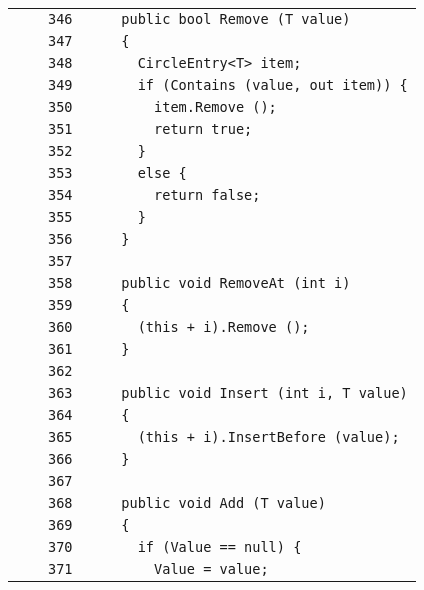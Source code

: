 \documentclass[a4paper,10pt]{article}
\begin{document}
\begin{longtable}[l]{lrrl}
\cellcolor{gray} &  & \verb~346~ & \verb~    public bool Remove (T value)~\\
\cellcolor{gray} &  & \verb~347~ & \verb~    {~\\
\cellcolor{gray} &  & \verb~348~ & \verb~      CircleEntry<T> item;~\\
\cellcolor{gray} &  & \verb~349~ & \verb~      if (Contains (value, out item)) {~\\
\cellcolor{gray} &  & \verb~350~ & \verb~        item.Remove ();~\\
\cellcolor{gray} &  & \verb~351~ & \verb~        return true;~\\
\cellcolor{gray} &  & \verb~352~ & \verb~      }~\\
\cellcolor{gray} &  & \verb~353~ & \verb~      else {~\\
\cellcolor{gray} &  & \verb~354~ & \verb~        return false;~\\
\cellcolor{gray} &  & \verb~355~ & \verb~      }~\\
\cellcolor{gray} &  & \verb~356~ & \verb~    }~\\
\cellcolor{gray} &  & \verb~357~ & \verb~~\\
\cellcolor{gray} &  & \verb~358~ & \verb~    public void RemoveAt (int i)~\\
\cellcolor{gray} &  & \verb~359~ & \verb~    {~\\
\cellcolor{gray} &  & \verb~360~ & \verb~      (this + i).Remove ();~\\
\cellcolor{gray} &  & \verb~361~ & \verb~    }~\\
\cellcolor{gray} &  & \verb~362~ & \verb~~\\
\cellcolor{gray} &  & \verb~363~ & \verb~    public void Insert (int i, T value)~\\
\cellcolor{gray} &  & \verb~364~ & \verb~    {~\\
\cellcolor{gray} &  & \verb~365~ & \verb~      (this + i).InsertBefore (value);~\\
\cellcolor{gray} &  & \verb~366~ & \verb~    }~\\
\cellcolor{gray} &  & \verb~367~ & \verb~~\\
\cellcolor{gray} &  & \verb~368~ & \verb~    public void Add (T value)~\\
\cellcolor{gray} &  & \verb~369~ & \verb~    {~\\
\cellcolor{gray} &  & \verb~370~ & \verb~      if (Value == null) {~\\
\cellcolor{gray} &  & \verb~371~ & \verb~        Value = value;~\\

\end{longtable}
\end{document}
